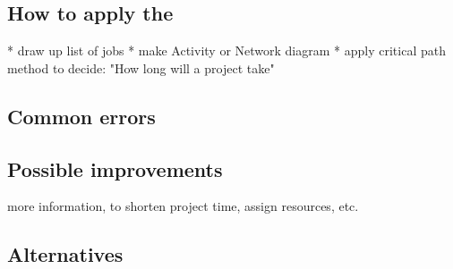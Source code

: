 \subsection{How to apply the \cpm}
* draw up list of jobs
* make Activity or Network diagram
* apply critical path method to decide: "How long will a project take"

\subsection{Common errors}

\subsection{Possible improvements}
more information, to shorten project time, assign resources, etc.

\subsection{Alternatives}
